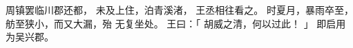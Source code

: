 
\switchcolumn*[\section{}]

周镇罢临川郡还都，
未及上住，泊青溪渚，
王丞相往看之。
时夏月，暴雨卒至，舫至狭小，而又大漏，殆
无复坐处。
王曰：「
    胡威之清，何以过此！
」
即启用为吴兴郡。

\switchcolumn



